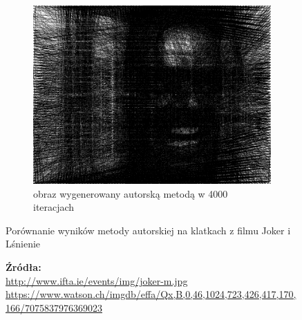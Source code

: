 \begin{figure}[H]
\begin{subfigure}{0.24\textwidth}
        \label{comp-comp-joker-shining-j}
    \end{subfigure}
    \begin{subfigure}{0.24\textwidth}
        \centering
        \includegraphics[width = \textwidth]{img/6-comp/shining_r_i4000_c20_inv0_bg10_obj1_ed1.png}
        \caption{obraz wygenerowany autorską metodą w 4000 iteracjach}
        \label{comp-comp-joker-shining-k}
    \end{subfigure}
    \caption{Porównanie wyników metody autorskiej na klatkach z filmu Joker i Lśnienie}
    \caption*{\footnotesize{\textbf{Źródła:}\\
    \url{http://www.ifta.ie/events/img/joker-m.jpg}\\
    {\url{https://www.watson.ch/imgdb/effa/Qx,B,0,46,1024,723,426,417,170,166/7075837976369023}}}}
    \label{comp-comp-joker-shining}
    \end{figure}
    

